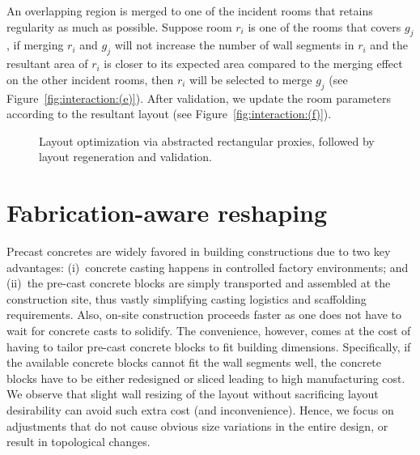 An overlapping region is merged to one of the incident rooms that retains regularity as much as possible. Suppose room $r_i$ is one of the rooms that covers $g_j$, if merging $r_i$ and $g_j$ will not increase the number of wall segments in $r_i$ and the resultant area of $r_i$ is closer to its expected area compared to the merging effect on the other incident rooms, then $r_i$ will be selected to merge $g_j$ (see Figure~\ref{fig:interaction:(e)}). After validation, we update the room parameters according to the resultant layout (see Figure~\ref{fig:interaction:(f)}).

\begin{figure}[t!]
\centering
{}
\caption[Layout optimization.]{Layout optimization via abstracted rectangular proxies, followed by layout regeneration and validation.}
\label{fig:interaction}
\vspace{-.1in}
\end{figure}

\section{Fabrication-aware reshaping}
\label{sec:fabrication}

Precast concretes are widely favored in building constructions due to two key advantages: (i)~concrete casting happens in controlled factory environments; and (ii)~the pre-cast concrete blocks are simply transported and assembled at the construction site, thus vastly simplifying casting logistics and scaffolding requirements. Also, on-site construction proceeds faster as one does not have to wait for concrete casts to solidify. The convenience, however, comes at the cost of having to tailor pre-cast concrete blocks to fit building dimensions. Specifically, if the available concrete blocks cannot fit the wall segments well, the concrete blocks have to be either redesigned or sliced leading to high manufacturing cost. We observe that slight wall resizing of the layout without sacrificing layout desirability can avoid such extra cost (and inconvenience). Hence, we focus on adjustments that do not cause obvious size variations in the entire design, or result in topological changes.

